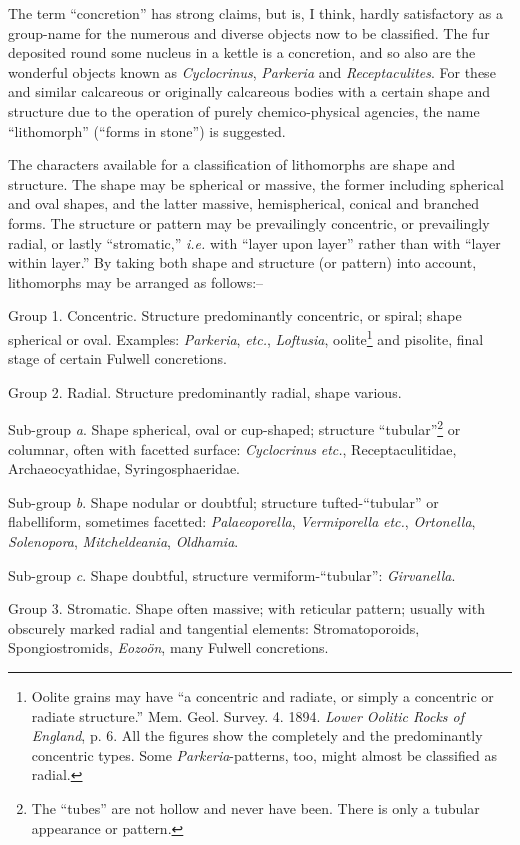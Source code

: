 \documentclass[a4paper, 12pt, oneside]{article}
\begin{document}
The term ``concretion'' has strong claims, but is, I think, hardly satisfactory as a group-name for the numerous and diverse objects now to be classified. The fur deposited round some nucleus in a kettle is a concretion, and so also are the wonderful objects known as \emph{Cyclocrinus}, \emph{Parkeria} and \emph{Receptaculites}. For these and similar calcareous or originally calcareous bodies with a certain shape and structure due to the operation of purely chemico-physical agencies, the name ``lithomorph'' (``forms in stone'') is suggested.

The characters available for a classification of lithomorphs are shape and structure. The shape may be spherical or massive, the former including spherical and oval shapes, and the latter massive, hemispherical, conical and branched forms. The structure or pattern may be prevailingly concentric, or prevailingly radial, or lastly ``stromatic,'' \emph{i.e.} with ``layer upon layer'' rather than with ``layer within layer.'' By taking both shape and structure (or pattern) into account, lithomorphs may be arranged as follows:--
\begin{description}
    \item Group 1. Concentric. Structure predominantly concentric, or spiral; shape spherical or oval. Examples: \emph{Parkeria}, \emph{etc.}, \emph{Loftusia}, oolite\footnote{Oolite grains may have ``a concentric and radiate, or simply a concentric or radiate structure.'' Mem. Geol. Survey. 4. 1894. \emph{Lower Oolitic Rocks of England}, p. 6. All the figures show the completely and the predominantly concentric types. Some \emph{Parkeria}-patterns, too, might almost be classified as radial.} and pisolite, final stage of certain Fulwell concretions.

    \item Group 2. Radial. Structure predominantly radial, shape various.

Sub-group \emph{a}. Shape spherical, oval or cup-shaped; structure ``tubular''\footnote{The ``tubes'' are not hollow and never have been. There is only a tubular appearance or pattern.} or columnar, often with facetted surface: \emph{Cyclocrinus} \emph{etc.}, Receptaculitidae, Archaeocyathidae, Syringosphaeridae.

Sub-group \emph{b}. Shape nodular or doubtful; structure tufted-``tubular'' or flabelliform, sometimes facetted: \emph{Palaeoporella}, \emph{Vermiporella} \emph{etc.}, \emph{Ortonella}, \emph{Solenopora}, \emph{Mitcheldeania}, \emph{Oldhamia}.

Sub-group \emph{c}. Shape doubtful, structure vermiform-``tubular'': \emph{Girvanella}.

    \item Group 3. Stromatic. Shape often massive; with reticular pattern; usually with obscurely marked radial and tangential elements: Stromatoporoids, Spongiostromids, \emph{Eozoön}, many Fulwell concretions.
\end{description}
\end{document}
